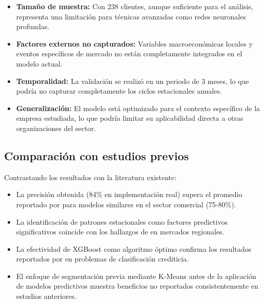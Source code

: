 \begin{itemize}
    \item \textbf{Tamaño de muestra:} Con 238 clientes, aunque suficiente para el análisis, representa una limitación para técnicas avanzadas como redes neuronales profundas.
    
    \item \textbf{Factores externos no capturados:} Variables macroeconómicas locales y eventos específicos de mercado no están completamente integrados en el modelo actual.
    
    \item \textbf{Temporalidad:} La validación se realizó en un periodo de 3 meses, lo que podría no capturar completamente los ciclos estacionales anuales.
    
    \item \textbf{Generalización:} El modelo está optimizado para el contexto específico de la empresa estudiada, lo que podría limitar su aplicabilidad directa a otras organizaciones del sector.
\end{itemize}

\subsection{Comparación con estudios previos}
Contrastando los resultados con la literatura existente:

\begin{itemize}
    \item La precisión obtenida (84\% en implementación real) supera el promedio reportado por \cite{garcia2024machine} para modelos similares en el sector comercial (75-80\%).
    
    \item La identificación de patrones estacionales como factores predictivos significativos coincide con los hallazgos de \cite{ramirez2023predictive} en mercados regionales.
    
    \item La efectividad de XGBoost como algoritmo óptimo confirma los resultados reportados por \citep{kim2022credit, lessmann2015benchmarking} en problemas de clasificación crediticia.
    
    \item El enfoque de segmentación previa mediante K-Means antes de la aplicación de modelos predictivos muestra beneficios no reportados consistentemente en estudios anteriores.
\end{itemize}

